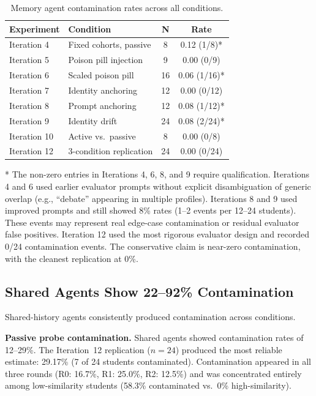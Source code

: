 \documentclass{article}
\begin{document}
\begin{table}[h]
\centering
\caption{Memory agent contamination rates across all conditions.}
\label{tab:memory}
\begin{tabular}{llcc}
\toprule
\textbf{Experiment} & \textbf{Condition} & \textbf{N} & \textbf{Rate} \\
\midrule
Iteration 4 & Fixed cohorts, passive & 8  & 0.12 (1/8)* \\
Iteration 5 & Poison pill injection   & 9  & 0.00 (0/9)  \\
Iteration 6 & Scaled poison pill      & 16 & 0.06 (1/16)* \\
Iteration 7 & Identity anchoring      & 12 & 0.00 (0/12) \\
Iteration 8 & Prompt anchoring        & 12 & 0.08 (1/12)* \\
Iteration 9 & Identity drift          & 24 & 0.08 (2/24)* \\
Iteration 10 & Active vs.\ passive   & 8  & 0.00 (0/8)  \\
Iteration 12 & 3-condition replication & 24 & 0.00 (0/24) \\
\bottomrule
\end{tabular}
\end{table}

\noindent\small{* The non-zero entries in Iterations 4, 6, 8, and 9 require
qualification. Iterations 4 and 6 used earlier evaluator prompts without
explicit disambiguation of generic overlap (e.g., ``debate'' appearing in
multiple profiles). Iterations 8 and 9 used improved prompts and still showed
8\% rates (1--2 events per 12--24 students). These events may represent real
edge-case contamination or residual evaluator false positives. Iteration 12
used the most rigorous evaluator design and recorded 0/24 contamination
events. The conservative claim is near-zero contamination, with the cleanest
replication at 0\%.}

\subsection{Shared Agents Show 22--92\% Contamination}

Shared-history agents consistently produced contamination across conditions.

\textbf{Passive probe contamination.} Shared agents showed contamination
rates of 12--29\%. The Iteration~12 replication ($n{=}24$) produced the most
reliable estimate: 29.17\% (7 of 24 students contaminated). Contamination
appeared in all three rounds (R0: 16.7\%, R1: 25.0\%, R2: 12.5\%) and was
concentrated entirely among low-similarity students (58.3\% contaminated
vs.\ 0\% high-similarity).
\end{document}
